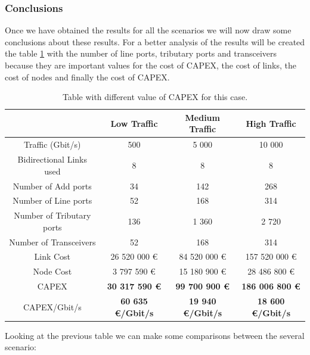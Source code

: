 \vspace{13pt}

\subsubsection{Conclusions}

Once we have obtained the results for all the scenarios we will now draw some conclusions about these results. For a better analysis of the results will be created the table \ref{table_comparative_transp_surv_heuristic} with the number of line ports, tributary ports and transceivers because they are important values for the cost of CAPEX, the cost of links, the cost of nodes and finally the cost of CAPEX.\\

\begin{table}[H]
\centering
\begin{tabular}{| c | c | c | c |}
 \hline
   & Low Traffic & Medium Traffic  & High Traffic \\
 \hline\hline
 Traffic (Gbit/s) & 500 & 5 000 & 10 000 \\ \hline
 Bidirectional Links used & 8 & 8 & 8 \\ \hline
 Number of Add ports & 34 & 142 & 268 \\ \hline
 Number of Line ports & 52 & 168 & 314 \\ \hline
 Number of Tributary ports & 136 & 1 360 & 2 720 \\ \hline
 Number of Transceivers & 52 & 168 & 314 \\ \hline
 Link Cost & 26 520 000 \euro & 84 520 000 \euro & 157 520 000 \euro \\ \hline
 Node Cost & 3 797 590 \euro & 15 180 900 \euro & 28 486 800 \euro \\ \hline
 CAPEX & \textbf{30 317 590 \euro} & \textbf{99 700 900 \euro} & \textbf{186 006 800 \euro} \\ \hline
 CAPEX/Gbit/s & \textbf{60 635 \euro/Gbit/s} & \textbf{19 940 \euro/Gbit/s} & \textbf{18 600 \euro/Gbit/s} \\ \hline
\end{tabular}
\caption{Table with different value of CAPEX for this case.}
\label{table_comparative_transp_surv_heuristic}
\end{table}

\noindent
Looking at the previous table we can make some comparisons between the several scenario:

